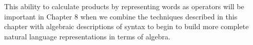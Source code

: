 \documentclass{report}
\begin{document}
This ability to calculate products by representing words as operators will be important in Chapter 8 when we combine the techniques described in this chapter with algebraic descriptions of syntax to begin to build more complete natural language representations in terms of algebra.





 
 
 
 
\end{document}

